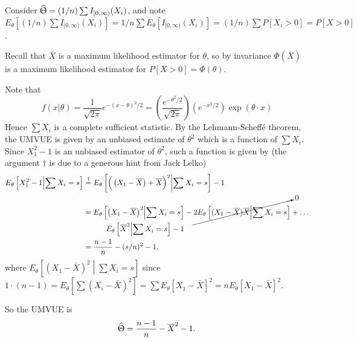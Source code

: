 \documentclass{stat_homework}
\begin{document}

\begin{solution}
  Consider $\hat\Uptheta = (1/n)\sum I_{[0,\infty)}(X_i)$, and note $E_\theta \left[(1/n)\sum I_{[0,\infty)}(X_i)\right] = 1/n\sum E_\theta [I_{[0,\infty)}(X_i)]=(1/n) \sum P[ X_i > 0] = P[X>0]$.
\end{solution}


Recall that $\bar X$ is a maximum likelihood estimator for $\theta$, so by invariance $\Phi(\bar X)$ is a maximum likelihood estimator for $P[X>0] = \Phi(\theta)$.
\newpage

\begin{solution}
  Note that 
  $$
    f(x|\theta)=\frac{1}{\sqrt{2\pi}} e^{-(x-\theta)^2/2} = 
      \left( \frac{e^{-\theta^2/2}}{\sqrt{2\pi}}\right) 
      \left( e^{-x^2/2} \right) 
      \exp(\theta \cdot x)
  $$
  Hence $\sum X_i$ is a complete sufficient statistic.  By the Lehmann-Scheff\'e theorem, the UMVUE is given by an unbiased estimate of $\theta^2$ which is a function of $\sum X_i$.  Since $X_1^2 - 1$ is an unbiased estimator of $\theta^2$, such a function is given by (the argument $\dagger$ is due to a generous hint from Jack Lelko)
  \begin{align*} 
    E_\theta \left[ X_1^2 - 1 \middle| \sum X_i = s\right]
    &\stackrel{\dagger}= E_\theta \left[ \Big(\left(X_1 - \bar X \right) + \bar X\Big)^2 \middle| \sum X_i = s\right] - 1 \\
    &= E_\theta \left[ \left( X_1 - \bar X\right)^2  \middle| \sum X_i = s\right] - \cancelto{0}{2 E_\theta \left[ (X_1 - \bar X) \bar X \middle| \sum X_i = s\right]} + \dots\\
    & \quad\quad\quad E_\theta \left[ \bar X^2 \middle| \sum X_i = s\right] - 1 \\
    &= \frac{n-1}{n} - (s/n)^2 - 1,
  \end{align*}
  where $E_\theta \left[ \left( X_1 - \bar X\right)^2  \middle| \sum X_i = s\right]$ since $1\cdot (n-1) = E_\theta\left[\sum(X_i-\bar X)^2\right] = \sum E_\theta[X_1-\bar X]^2 = n E_\theta [X_1 - \bar X]^2$.

  So the UMVUE is 
  $$
  \hat \Uptheta = \frac{n-1}{n} - \bar X^2 -1.
  $$
\end{solution}
\newpage
\end{document}
